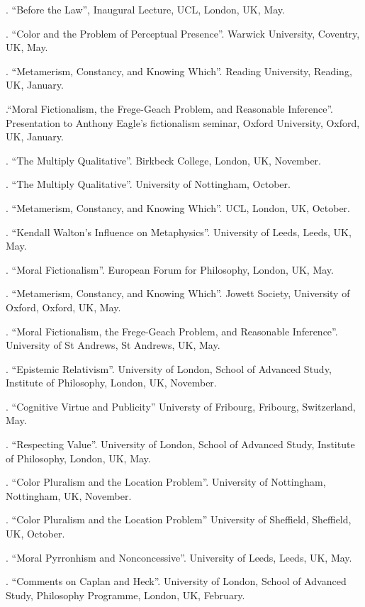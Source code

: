 \documentclass[11pt]{article}
\begin{document}
. ``Before the Law'', Inaugural Lecture, UCL, London, UK, May.

.  ``Color and the Problem of Perceptual Presence''. Warwick University, Coventry, UK, May.

. ``Metamerism, Constancy, and Knowing Which''. Reading University, Reading, UK, January.

.``Moral Fictionalism, the Frege-Geach Problem, and Reasonable Inference''. Presentation to Anthony Eagle's fictionalism seminar, Oxford University, Oxford, UK, January.

. ``The Multiply Qualitative''. Birkbeck College, London, UK, November.

. ``The Multiply Qualitative''. University of Nottingham, October.

. ``Metamerism, Constancy, and Knowing Which''. UCL, London, UK, October.

. ``Kendall Walton's Influence on Metaphysics''. University of Leeds, Leeds, UK, May.

. ``Moral Fictionalism''. European Forum for Philosophy, London, UK, May.

. ``Metamerism, Constancy, and Knowing Which''. Jowett Society, University of Oxford, Oxford, UK, May.

. ``Moral Fictionalism, the Frege-Geach Problem, and Reasonable Inference''. University of St Andrews, St Andrews, UK, May.

. ``Epistemic Relativism''. University of London, School of Advanced Study, Institute of Philosophy, London, UK, November.

. ``Cognitive Virtue and Publicity'' Universty of Fribourg, Fribourg, Switzerland, May. 

. ``Respecting Value''. University of London, School of Advanced Study, Institute of Philosophy, London, UK, May.

. ``Color Pluralism and the Location Problem''. University of Nottingham, Nottingham, UK, November.

. ``Color Pluralism and the Location Problem'' University of Sheffield, Sheffield, UK, October.

. ``Moral Pyrronhism and Nonconcessive''. University of Leeds, Leeds, UK, May.

. ``Comments on Caplan and Heck''. University of London, School of Advanced Study, Philosophy Programme, London, UK, February.
\end{document}
